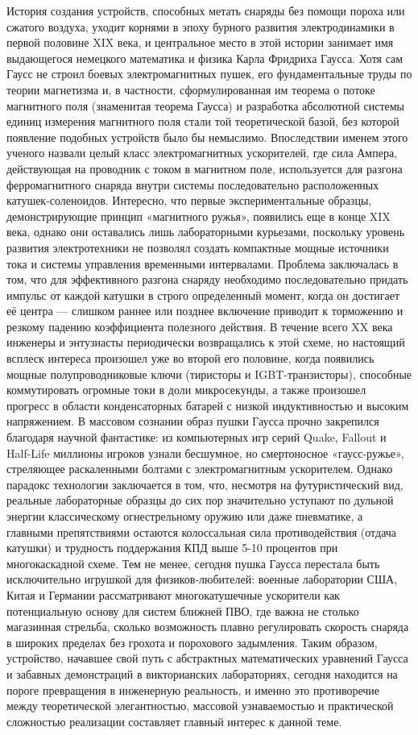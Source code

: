 \documentclass[14pt]{extarticle}
\begin{document}
История создания устройств, способных метать снаряды без помощи пороха или сжатого воздуха, уходит корнями в эпоху бурного развития электродинамики в первой половине XIX века, и центральное место в этой истории занимает имя выдающегося немецкого математика и физика Карла Фридриха Гаусса. Хотя сам Гаусс не строил боевых электромагнитных пушек, его фундаментальные труды по теории магнетизма и, в частности, сформулированная им теорема о потоке магнитного поля (знаменитая теорема Гаусса) и разработка абсолютной системы единиц измерения магнитного поля стали той теоретической базой, без которой появление подобных устройств было бы немыслимо. Впоследствии именем этого ученого назвали целый класс электромагнитных ускорителей, где сила Ампера, действующая на проводник с током в магнитном поле, используется для разгона ферромагнитного снаряда внутри системы последовательно расположенных катушек-соленоидов. Интересно, что первые экспериментальные образцы, демонстрирующие принцип «магнитного ружья», появились еще в конце XIX века, однако они оставались лишь лабораторными курьезами, поскольку уровень развития электротехники не позволял создать компактные мощные источники тока и системы управления временными интервалами. Проблема заключалась в том, что для эффективного разгона снаряду необходимо последовательно придать импульс от каждой катушки в строго определенный момент, когда он достигает её центра — слишком раннее или позднее включение приводит к торможению и резкому падению коэффициента полезного действия. В течение всего XX века инженеры и энтузиасты периодически возвращались к этой схеме, но настоящий всплеск интереса произошел уже во второй его половине, когда появились мощные полупроводниковые ключи (тиристоры и IGBT-транзисторы), способные коммутировать огромные токи в доли микросекунды, а также произошел прогресс в области конденсаторных батарей с низкой индуктивностью и высоким напряжением. В массовом сознании образ пушки Гаусса прочно закрепился благодаря научной фантастике: из компьютерных игр серий Quake, Fallout и Half-Life миллионы игроков узнали бесшумное, но смертоносное «гаусс-ружье», стреляющее раскаленными болтами с электромагнитным ускорителем. Однако парадокс технологии заключается в том, что, несмотря на футуристический вид, реальные лабораторные образцы до сих пор значительно уступают по дульной энергии классическому огнестрельному оружию или даже пневматике, а главными препятствиями остаются колоссальная сила противодействия (отдача катушки) и трудность поддержания КПД выше 5-10 процентов при многокаскадной схеме. Тем не менее, сегодня пушка Гаусса перестала быть исключительно игрушкой для физиков-любителей: военные лаборатории США, Китая и Германии рассматривают многокатушечные ускорители как потенциальную основу для систем ближней ПВО, где важна не столько магазинная стрельба, сколько возможность плавно регулировать скорость снаряда в широких пределах без грохота и порохового задымления. Таким образом, устройство, начавшее свой путь с абстрактных математических уравнений Гаусса и забавных демонстраций в викторианских лабораториях, сегодня находится на пороге превращения в инженерную реальность, и именно это противоречие между теоретической элегантностью, массовой узнаваемостью и практической сложностью реализации составляет главный интерес к данной теме.
\newpage
\end{document}
